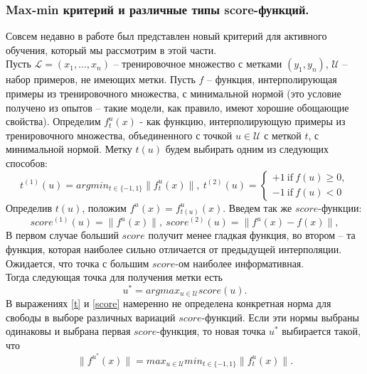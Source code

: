 \documentclass{llncs}
\begin{document}
\subsubsection{Max-min критерий и различные типы score-функций.}
Совсем недавно в работе \cite{av} был представлен новый критерий для активного обучения, который мы рассмотрим в этой части.\\
Пусть $\mathcal{L} = (x_1, ..., x_n)$ -- тренировочное множество с метками $(y_1, y_n)$, $\mathcal{U}$ -- набор примеров, не имеющих метки. Пусть $f$ -- функция, интерполирующая примеры из тренировочного множества, с минимальной нормой (это условие получено из опытов \cite{minnorm} -- такие модели, как правило, имеют хорошие обощающие свойства). Определим $f_t^u(x)$ - как функцию, интерполирующую примеры из тренировочного множества, объединенного с точкой $u \in \mathcal{U}$ с меткой $t$, с минимальной нормой. Метку $t(u)$ будем выбирать одним из следующих способов:
\begin{equation}\label{t}
t^{(1)}(u) = argmin_{t\in\{-1,1\}}\|f_t^u(x)\|, \ t^{(2)}(u) = 
 \begin{cases}
   +1 \ \text{if} \ f(u) \geq 0, 
   \\
   -1  \ \text{if} \ f(u) < 0
 \end{cases}
\end{equation}
Определив $t(u)$, положим $f^u(x) = f^u_{t(u)}(x)$. Введем так же $score$-функции:
\begin{equation}\label{score}
score^{(1)}(u) = \|f^u(x)\|, \ score^{(2)}(u) = \|f^u(x)-f(x)\|,
\end{equation}
В первом случае больший $score$ получит менее гладкая функция, во втором -- та функция, которая наиболее сильно отличается от предыдущей интерполяции. Ожидается, что точка с большим $score$-ом наиболее информативная.\\
Тогда следующая точка для получения метки есть $$u^* = argmax_{u \in \mathcal{U}} score(u).$$
В выражениях \eqref{t} и \eqref{score} намеренно не определена конкретная норма для свободы в выборе различных вариаций $score$-функций. Если эти нормы выбраны одинаковы и выбрана первая $score$-функция, то новая точка $u^*$ выбирается такой, что
\begin{equation}
\|f^{u^*}(x)\| = max_{u \in \mathcal{U}}min_{t\in\{-1,1\}} \|f_t^u(x) \|.
\end{equation}
\end{document}
